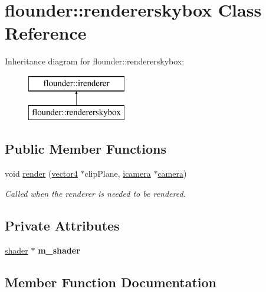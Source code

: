 \hypertarget{classflounder_1_1rendererskybox}{}\section{flounder\+:\+:rendererskybox Class Reference}
\label{classflounder_1_1rendererskybox}
Inheritance diagram for flounder\+:\+:rendererskybox\+:\begin{figure}[H]
\begin{center}
\leavevmode
\includegraphics[height=2.000000cm]{classflounder_1_1rendererskybox}
\end{center}
\end{figure}
\subsection*{Public Member Functions}
\begin{DoxyCompactItemize}
\item 
void \hyperlink{classflounder_1_1rendererskybox_a3903974ac1a1e2af5b5a8fcbfe8ea433}{render} (\hyperlink{classflounder_1_1vector4}{vector4} $\ast$clip\+Plane, \hyperlink{classflounder_1_1icamera}{icamera} $\ast$\hyperlink{classflounder_1_1camera}{camera})
\begin{DoxyCompactList}\small\item\em Called when the renderer is needed to be rendered. \end{DoxyCompactList}\end{DoxyCompactItemize}
\subsection*{Private Attributes}
\begin{DoxyCompactItemize}
\item 
\mbox{\label{classflounder_1_1rendererskybox_adb28a7431338a5af369601d7c8ef73ff}} 
\hyperlink{classflounder_1_1shader}{shader} $\ast$ {\bfseries m\+\_\+shader}
\end{DoxyCompactItemize}


\subsection{Member Function Documentation}
\mbox{\label{classflounder_1_1rendererskybox_a3903974ac1a1e2af5b5a8fcbfe8ea433}} 
